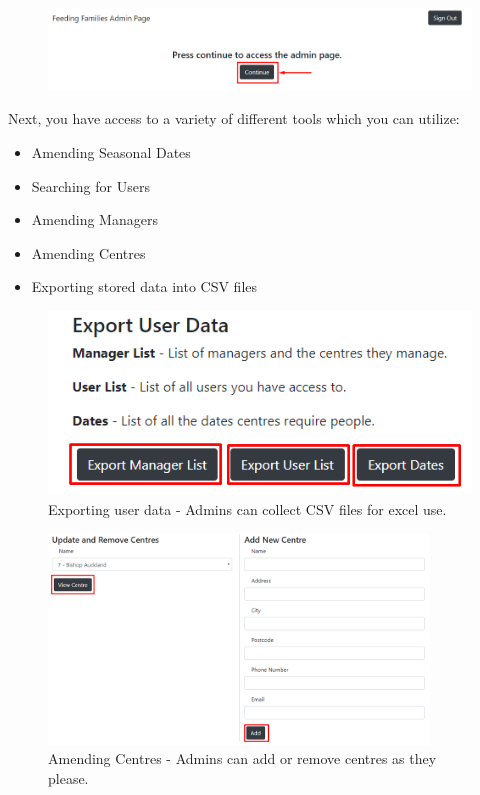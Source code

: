 \documentclass[12pt]{article}
\begin{document}
\begin{figure}[H]
    \centering
    \includegraphics[width=1\textwidth]{admins/adminaccess.png}
\end{figure}

Next, you have access to a variety of different tools which you can utilize:
\begin{itemize}
   \item Amending Seasonal Dates
   \item Searching for Users
   \item Amending Managers
   \item Amending Centres
   \item Exporting stored data into CSV files
   
\end{itemize}

\begin{figure}[H]
    \centering
    \includegraphics[width=1\textwidth]{admins/export.png}
    \caption{Exporting user data - Admins can collect CSV files for excel use.}
\end{figure}


\begin{figure}[H]
    \centering
    \includegraphics[width=0.9\textwidth]{admins/centres.png}
    \caption{Amending Centres - Admins can add or remove centres as they please.}
\end{figure}
\end{document}
